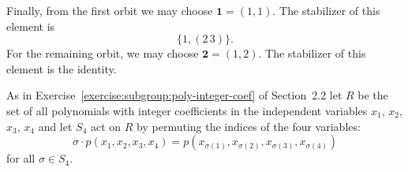 \begin{solution}
  Finally, from the first orbit we may choose $\mathbf1 = (1,1)$. The
  stabilizer of this element is
  \begin{equation*}
    \{1, (2\,3)\}.
  \end{equation*}
  For the remaining orbit, we may choose $\mathbf2 = (1,2)$. The
  stabilizer of this element is the identity.
\end{solution}

 As in Exercise~\ref{exercise:subgroup:poly-integer-coef} of
Section~2.2 let $R$ be the set of all polynomials with integer
coefficients in the independent variables $x_1$, $x_2$, $x_3$, $x_4$
and let $S_4$ act on $R$ by permuting the indices of the four
variables:
\begin{equation*}
  \sigma\cdot p(x_1,x_2,x_3,x_4)
  = p(x_{\sigma(1)},x_{\sigma(2)},x_{\sigma(3)},x_{\sigma(4)})
\end{equation*}
for all $\sigma\in S_4$.
